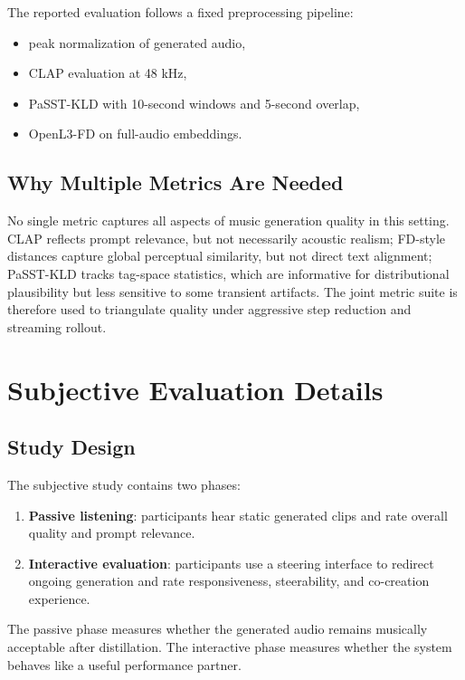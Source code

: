 \documentclass[11pt]{article}
\begin{document}
The reported evaluation follows a fixed preprocessing pipeline:
\begin{itemize}
    \item peak normalization of generated audio,
    \item CLAP evaluation at 48 kHz,
    \item PaSST-KLD with 10-second windows and 5-second overlap,
    \item OpenL3-FD on full-audio embeddings.
\end{itemize}

\subsection{Why Multiple Metrics Are Needed}

No single metric captures all aspects of music generation quality in this setting. CLAP reflects prompt relevance, but not necessarily acoustic realism; FD-style distances capture global perceptual similarity, but not direct text alignment; PaSST-KLD tracks tag-space statistics, which are informative for distributional plausibility but less sensitive to some transient artifacts. The joint metric suite is therefore used to triangulate quality under aggressive step reduction and streaming rollout.

\section{Subjective Evaluation Details}

\subsection{Study Design}

The subjective study contains two phases:
\begin{enumerate}
    \item \textbf{Passive listening}: participants hear static generated clips and rate overall quality and prompt relevance.
    \item \textbf{Interactive evaluation}: participants use a steering interface to redirect ongoing generation and rate responsiveness, steerability, and co-creation experience.
\end{enumerate}

The passive phase measures whether the generated audio remains musically acceptable after distillation. The interactive phase measures whether the system behaves like a useful performance partner.
\end{document}

